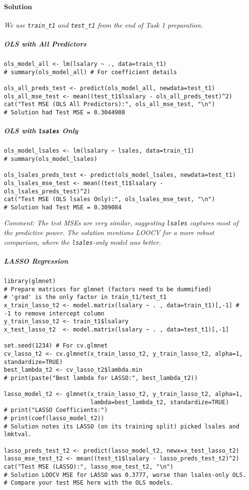 \documentclass[12pt,a4paper]{article}
\newcommand{\Rcode}[1]{\texttt{#1}} %
\begin{document}
        \paragraph{Solution}
            \textit{We use \Rcode{train\_t1} and \Rcode{test\_t1} from the end of Task 1 preparation.}
            \subparagraph{OLS with All Predictors}
\begin{lstlisting}
ols_model_all <- lm(lsalary ~ ., data=train_t1)
# summary(ols_model_all) # For coefficient details

ols_all_preds_test <- predict(ols_model_all, newdata=test_t1)
ols_all_mse_test <- mean((test_t1$lsalary - ols_all_preds_test)^2)
cat("Test MSE (OLS All Predictors):", ols_all_mse_test, "\n")
# Solution had Test MSE = 0.3044908
\end{lstlisting}
            \subparagraph{OLS with \Rcode{lsales} Only}
\begin{lstlisting}
ols_model_lsales <- lm(lsalary ~ lsales, data=train_t1)
# summary(ols_model_lsales)

ols_lsales_preds_test <- predict(ols_model_lsales, newdata=test_t1)
ols_lsales_mse_test <- mean((test_t1$lsalary - ols_lsales_preds_test)^2)
cat("Test MSE (OLS lsales Only):", ols_lsales_mse_test, "\n")
# Solution had Test MSE = 0.309084
\end{lstlisting}
            \textit{Comment: The test MSEs are very similar, suggesting \Rcode{lsales} captures most of the predictive power. The solution mentions LOOCV for a more robust comparison, where the \Rcode{lsales}-only model was better.}

            \subparagraph{LASSO Regression}
\begin{lstlisting}
library(glmnet)
# Prepare matrices for glmnet (factors need to be dummified)
# 'grad' is the only factor in train_t1/test_t1
x_train_lasso_t2 <- model.matrix(lsalary ~ . , data=train_t1)[,-1] # -1 to remove intercept column
y_train_lasso_t2 <- train_t1$lsalary
x_test_lasso_t2  <- model.matrix(lsalary ~ . , data=test_t1)[,-1]

set.seed(1234) # For cv.glmnet
cv_lasso_t2 <- cv.glmnet(x_train_lasso_t2, y_train_lasso_t2, alpha=1, standardize=TRUE)
best_lambda_t2 <- cv_lasso_t2$lambda.min
# print(paste("Best lambda for LASSO:", best_lambda_t2))

lasso_model_t2 <- glmnet(x_train_lasso_t2, y_train_lasso_t2, alpha=1, 
                         lambda=best_lambda_t2, standardize=TRUE)
# print("LASSO Coefficients:")
# print(coef(lasso_model_t2)) 
# Solution notes its LASSO (on its training split) picked lsales and lmktval.

lasso_preds_test_t2 <- predict(lasso_model_t2, newx=x_test_lasso_t2)
lasso_mse_test_t2 <- mean((test_t1$lsalary - lasso_preds_test_t2)^2)
cat("Test MSE (LASSO):", lasso_mse_test_t2, "\n")
# Solution LOOCV MSE for LASSO was 0.3777, worse than lsales-only OLS.
# Compare your test MSE here with the OLS models.
\end{lstlisting}
\end{document}
